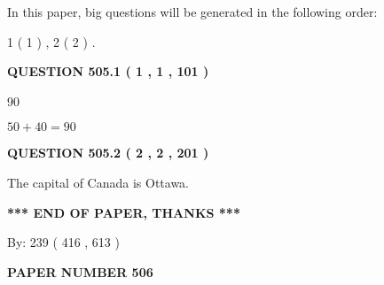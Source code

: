 \documentclass[12pt]{article}
\begin{document}
   
   
\vspace{0.2in}
   
In this paper, big questions will be generated in the following order: 
   
   
   1 ( 1 )
 ,
   2 ( 2 )
 .
  
\vspace{0.2in}
  
{\textbf{\Large{QUESTION
505.1 
 ( 1 , 1 , 101 )
}}}
  
  
 
 
\noindent{}

90
 
 
 
 
\noindent{}

$ %
50 +  %
40=   %
90$
 
 
  
\vspace{0.2in}
  
{\textbf{\Large{QUESTION
505.2 
 ( 2 , 2 , 201 )
}}}
  
  
 
 
\noindent{}
 
 
The capital of Canada is Ottawa.
 
 
 
 
   
   
 \vspace{0.2in}
 
   
   
   
   
\vspace{1.0in} 
{\textbf{\large{ *** END OF PAPER, THANKS *** }}} 
   
   
\hspace{1.0in} By: 
 239 ( 416 ,  613 )
   
   
   
   
\newpage 
\setcounter{page}{ 
   506001 } 
   
   
   
   
 {\textbf{ \Large{ PAPER NUMBER  506  }}}
   
   
\vspace{0.2in}
   
   
   
\end{document}
